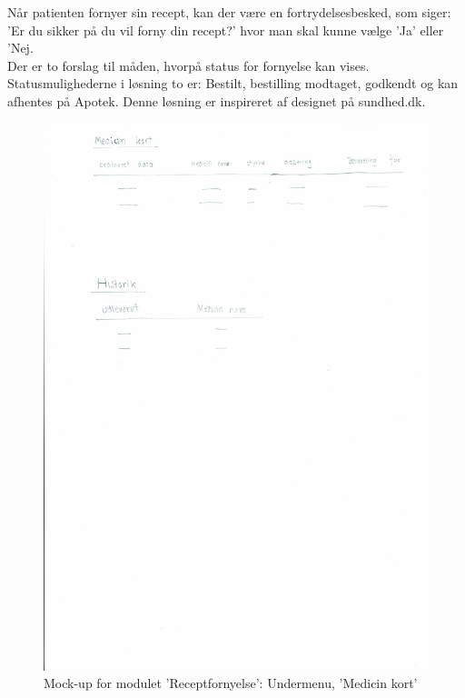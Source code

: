 Når patienten fornyer sin recept, kan der være en fortrydelsesbesked, som siger: 'Er du sikker på du vil forny din recept?' hvor man skal kunne vælge 'Ja' eller 'Nej.\\
Der er to forslag til måden, hvorpå status for fornyelse kan vises.  Statusmulighederne i løsning to er: Bestilt, bestilling modtaget, godkendt og kan afhentes på Apotek. Denne løsning er inspireret af designet på sundhed.dk.\\
\begin{figure}[H]
	\centering
	\includegraphics[angle=0, width=\linewidth]{Materials/FornyRecept_Medicinkort.pdf}
	\caption{Mock-up for modulet 'Receptfornyelse': Undermenu, 'Medicin kort'}
	\label{fig:Mock-Up3}
\end{figure}
